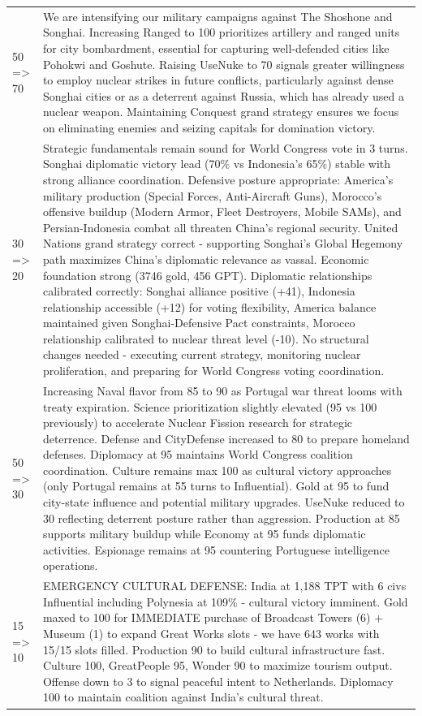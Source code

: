 \begin{longtable}{p{}p{}}
50 => 70 & We are intensifying our military campaigns against The Shoshone and Songhai. Increasing Ranged to 100 prioritizes artillery and ranged units for city bombardment, essential for capturing well-defended cities like Pohokwi and Goshute. Raising UseNuke to 70 signals greater willingness to employ nuclear strikes in future conflicts, particularly against dense Songhai cities or as a deterrent against Russia, which has already used a nuclear weapon. Maintaining Conquest grand strategy ensures we focus on eliminating enemies and seizing capitals for domination victory. \\
30 => 20 & Strategic fundamentals remain sound for World Congress vote in 3 turns. Songhai diplomatic victory lead (70\% vs Indonesia's 65\%) stable with strong alliance coordination. Defensive posture appropriate: America's military production (Special Forces, Anti-Aircraft Guns), Morocco's offensive buildup (Modern Armor, Fleet Destroyers, Mobile SAMs), and Persian-Indonesia combat all threaten China's regional security. United Nations grand strategy correct - supporting Songhai's Global Hegemony path maximizes China's diplomatic relevance as vassal. Economic foundation strong (3746 gold, 456 GPT). Diplomatic relationships calibrated correctly: Songhai alliance positive (+41), Indonesia relationship accessible (+12) for voting flexibility, America balance maintained given Songhai-Defensive Pact constraints, Morocco relationship calibrated to nuclear threat level (-10). No structural changes needed - executing current strategy, monitoring nuclear proliferation, and preparing for World Congress voting coordination. \\
50 => 30 & Increasing Naval flavor from 85 to 90 as Portugal war threat looms with treaty expiration. Science prioritization slightly elevated (95 vs 100 previously) to accelerate Nuclear Fission research for strategic deterrence. Defense and CityDefense increased to 80 to prepare homeland defenses. Diplomacy at 95 maintains World Congress coalition coordination. Culture remains max 100 as cultural victory approaches (only Portugal remains at 55 turns to Influential). Gold at 95 to fund city-state influence and potential military upgrades. UseNuke reduced to 30 reflecting deterrent posture rather than aggression. Production at 85 supports military buildup while Economy at 95 funds diplomatic activities. Espionage remains at 95 countering Portuguese intelligence operations. \\
15 => 10 & EMERGENCY CULTURAL DEFENSE: India at 1,188 TPT with 6 civs Influential including Polynesia at 109\% - cultural victory imminent. Gold maxed to 100 for IMMEDIATE purchase of Broadcast Towers (6) + Museum (1) to expand Great Works slots - we have 643 works with 15/15 slots filled. Production 90 to build cultural infrastructure fast. Culture 100, GreatPeople 95, Wonder 90 to maximize tourism output. Offense down to 3 to signal peaceful intent to Netherlands. Diplomacy 100 to maintain coalition against India's cultural threat. \\

\end{longtable}
